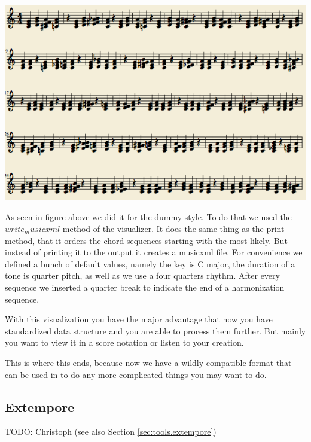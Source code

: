 \includegraphics[scale=.5]{Chapters/pic/xml_print.png}

As seen in figure above we did it for the dummy style. To do that we used the $write_musicxml$ method of the visualizer. It does the same thing as the print method, that it orders the chord sequences starting with the most likely. But instead of printing it to the output it creates a musicxml file. For convenience we defined a bunch of default values, namely the key is C major, the duration of a tone is quarter pitch, as well as we use a four quarters rhythm. After every sequence we inserted a quarter break to indicate the end of a harmonization sequence.

With this visualization you have the major advantage that now you have standardized data structure and you are able to process them further. But mainly you want to view it in a score notation or listen to your creation.

This is where this ends, because now we have a wildly compatible format that can be used in to do any more complicated things you may want to do. 

\subsection{Extempore}
\label{sec:viewers.extempore}

TODO: Christoph (see also Section \ref{sec:tools.extempore})